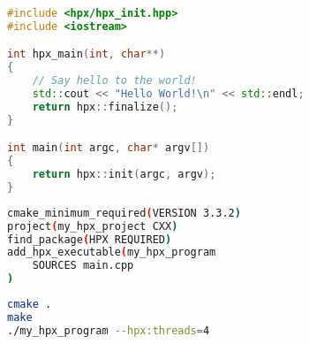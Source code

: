 \begin{lstlisting}[language=c++,caption={Initializing the HPX runtime system (II).\label{code:hpx:init}},float,floatplacement=tb]
#include <hpx/hpx_init.hpp>
#include <iostream>

int hpx_main(int, char**)
{
    // Say hello to the world!
    std::cout << "Hello World!\n" << std::endl;
    return hpx::finalize();
}

int main(int argc, char* argv[])
{
    return hpx::init(argc, argv);
}
\end{lstlisting}


\begin{minipage}{\linewidth}
\begin{minipage}{0.45\linewidth}
\begin{lstlisting}[language=bash,caption={Content of the CMakeLists.txt to build HPX applications.\label{code:cmake:hpx}},emph={project, add_executable,cmake_minimum_required},emphstyle={\color{azure}\bfseries}]
cmake_minimum_required(VERSION 3.3.2)
project(my_hpx_project CXX)
find_package(HPX REQUIRED)
add_hpx_executable(my_hpx_program
    SOURCES main.cpp
)
\end{lstlisting}
\end{minipage}
\hfill
\begin{minipage}{0.45\linewidth}
\begin{lstlisting}[language=bash,caption={Build instructions for CMake.\label{code:cmake:compile:hpx}}]
cmake .
make
./my_hpx_program --hpx:threads=4
\end{lstlisting}
\end{minipage}
\end{minipage}



